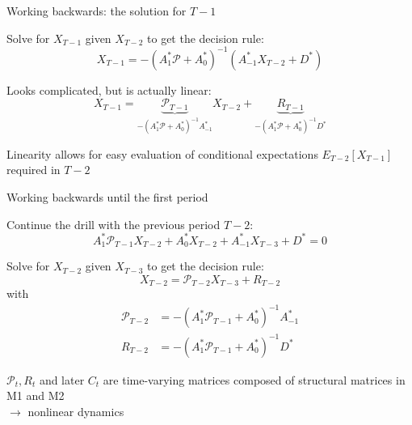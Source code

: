\begin{frame}{Working backwards: the solution for $T-1$}
\begin{wideitemize}
\item Solve for $X_{T-1}$ given $X_{T-2}$ to get the decision rule:
\begin{equation}
  X_{T-1} = -\left(A_1^{\ast}\mathcal{P}+A_0^{\ast}\right)^{-1}\left(A_{-1}^{\ast}X_{T-2}+D^{\ast}\right)
\end{equation}
\item Looks complicated, but is actually linear:
\begin{equation}
  X_{T-1} =  \underbrace{\mathcal{P}_{T-1}}_{-\left(A_1^{\ast}\mathcal{P}+A_0^{\ast}\right)^{-1}A_{-1}^{\ast}}X_{T-2}
  + \underbrace{R_{T-1}}_{-\left(A_1^{\ast}\mathcal{P}+A_0^{\ast}\right)^{-1}D^{\ast}}
\end{equation}
\item Linearity allows for easy evaluation of conditional expectations $E_{T-2}[X_{T-1}]$ required in $T-2$
\end{wideitemize}
\end{frame}

\begin{frame}{Working backwards until the first period}
\begin{wideitemize}
\item Continue the drill with the previous period $T-2$:
\begin{equation}
  A_1^{\ast}\mathcal{P}_{T-1}X_{T-2} + A_0^{\ast}X_{T-2}  + A_{-1}^{\ast}X_{T-3} + D^{\ast}= 0
\end{equation}
\item Solve for $X_{T-2}$ given $X_{T-3}$ to get the decision rule:
\begin{equation}
	X_{T-2} =    \mathcal{P}_{T-2}X_{T-3}+ R_{T-2}
\end{equation}
with
\begin{align}
\mathcal{P}_{T-2} &= -\left(A_1^{\ast}\mathcal{P}_{T-1}+A_0^{\ast}\right)^{-1}A_{-1}^{\ast}\\
R_{T-2} &= -\left(A_1^{\ast}\mathcal{P}_{T-1}+A_0^{\ast}\right)^{-1}D^{\ast}
\end{align}
\item $\mathcal{P}_t, R_t$ and later $C_t$ are time-varying matrices composed of structural matrices in M1 and M2\\
$\rightarrow$ nonlinear dynamics
\end{wideitemize}
\end{frame}

